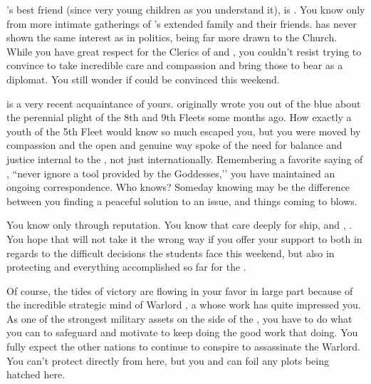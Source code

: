 \documentclass[char]{GL2020}
\begin{document}
\cPresident{}’s best friend (since very young children as you understand it), is \cInitiate{\full}. You know \cInitiate{\them} only from more intimate gatherings of \cHeadDiplomat{}’s extended family and their friends. \cInitiate{} has never shown the same interest as \cPresident{} in politics, being far more drawn to the Church. While you have great respect for the Clerics of \cEbb{} and \cFlow{}, you couldn’t resist trying to convince \cInitiate{} to take \cInitiate{\their} incredible care and compassion and bring those to bear as a diplomat. You still wonder if \cInitiate{\they} could be convinced this weekend.  

\cPirateChild{\full} is a very recent acquaintance of yours. \cPirateChild{\They} originally wrote you out of the blue about the perennial plight of the 8th and 9th Fleets some months ago. How exactly a youth of the 5th Fleet would know so much escaped you, but you were moved by \cPirateChild{\their} compassion and the open and genuine way \cPirateChild{\they} spoke of the need for balance and justice internal to the \pShip{}, not just internationally. Remembering a favorite saying of \cHeadDiplomat{}, ``never ignore a tool provided by the Goddesses,’’ you have maintained an ongoing correspondence. Who knows? Someday knowing \cPirateChild{} may be the difference between you finding a peaceful solution to an issue, and things coming to blows.

You know \cWarlordDaughter{\full} only through reputation. You know that \cWarlordDaughter{\they} care\cWarlordDaughter{\verbs} deeply for \cWarlordDaughter{\their} ship, and \cWarlordDaughter{\their} \cLoud{\parent}, \cLoud{\full}. You hope that \cWarlordDaughter{} will not take it the wrong way if you offer your support to \cWarlordDaughter{\them} both in regards to the difficult decisions the students face this weekend, but also in protecting \cLoud{} and everything \cLoud{\they} \cLoud{\have} accomplished so far for the \pShip{}.

Of course, the tides of victory are flowing in your favor in large part because of the incredible strategic mind of Warlord \cLoud{\full}, a \cLoud{\person} whose work has quite impressed you. As one of the strongest military assets on the side of the \pShip{}, you have to do what you can to safeguard and motivate \cLoud{} to keep doing the good work that \cLoud{\theyare} doing. You fully expect the other nations to continue to conspire to assassinate the Warlord. You can't protect \cLoud{} directly from here, but you and \cWarlordDaughter{} can foil any plots being hatched here.
\end{document}
